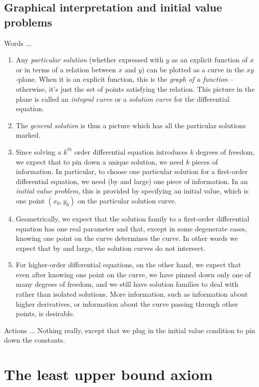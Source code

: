\documentclass[10pt]{amsart}
\begin{document}
\subsection{Graphical interpretation and initial value problems}

Words ...

\begin{enumerate}
\item Any {\em particular solution} (whether expressed with $y$ as an
  explicit function of $x$ or in terms of a relation between $x$ and
  $y$) can be plotted as a curve in the $xy$-plane. When it is an
  explicit function, this is the {\em graph of a function} --
  otherwise, it's just the set of points satisfying the relation. This
  picture in the plane is called an {\em integral curve} or a {\em
  solution curve} for the differential equation.
\item The {\em general solution} is thus a picture which has all the
  particular solutions marked.
\item Since solving a $k^{th}$ order differential equation introduces
  $k$ degrees of freedom, we expect that to pin down a unique
  solution, we need $k$ pieces of information. In particular, to
  choose one particular solution for a first-order differential
  equation, we need (by and large) one piece of information. In an
  {\em initial value problem}, this is provided by specifying an
  initial value, which is one point $(x_0,y_0)$ on the particular
  solution curve.
\item Geometrically, we expect that the solution family to a
  first-order differential equation has one real parameter and that,
  except in some degenerate cases, knowing one point on the curve
  determines the curve. In other words we expect that by and large,
  the solution curves do not intersect.
\item For higher-order differential equations, on the other hand, we
  expect that even after knowing one point on the curve, we have
  pinned down only one of many degrees of freedom, and we still have
  solution families to deal with rather than isolated solutions. More
  information, such as information about higher derivatives, or
  information about the curve passing through other points, is
  desirable.
\end{enumerate}

Actions ... Nothing really, except that we plug in the initial value
condition to pin down the constants.

\section{The least upper bound axiom}
\end{document}
